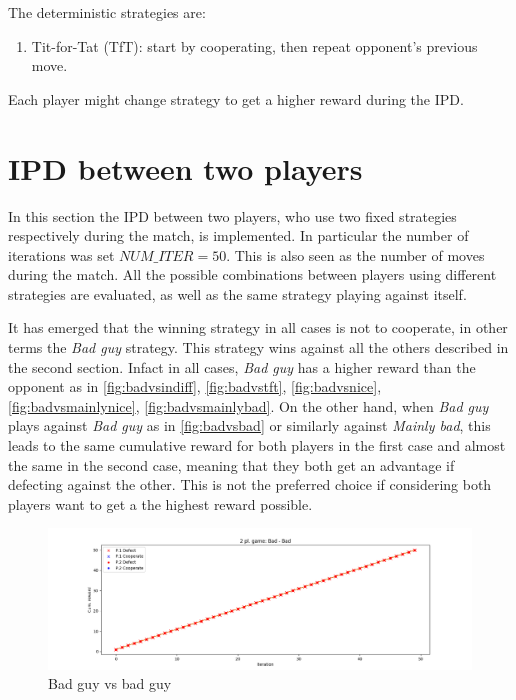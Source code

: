 \documentclass[journal,a4paper,10pt,twoside]{IEEEtran}
\begin{document}
The deterministic strategies are:
\begin{enumerate}
    \item Tit-for-Tat (TfT): start by cooperating, then repeat opponent's previous move.
\end{enumerate}

Each player might change strategy to get a higher reward during the IPD.

\section{IPD between two players}
In this section the IPD between two players, who use two fixed strategies respectively during the match, is implemented.
In particular the number of iterations was set $NUM\_ITER = 50$. This is also seen as the number of moves during the match. All the possible combinations between players using different strategies are evaluated, as well as the same strategy playing against itself.

It has emerged that the winning strategy in all cases is not to cooperate, in other terms the \textit{Bad guy} strategy. This strategy wins against all the others described in the second section. Infact in all cases, \textit{Bad guy} has a higher reward than the opponent as in \autoref{fig:badvsindiff}, \autoref{fig:badvstft}, \autoref{fig:badvsnice}, \autoref{fig:badvsmainlynice}, \autoref{fig:badvsmainlybad}. 
On the other hand, when \textit{Bad guy} plays against \textit{Bad guy} as in \autoref{fig:badvsbad} or similarly against \textit{Mainly bad}, this leads to the same cumulative reward for both players in the first case and almost the same in the second case, meaning that they both get an advantage if defecting against the other. This is not the preferred choice if considering both players want to get a the highest reward possible.

\begin{figure}
    \centering
    \includegraphics[width=1\columnwidth]{img_v1/idp2p-rewards-Bad-Bad.png}
    \caption{Bad guy vs bad guy}
    \label{fig:badvsbad}
\end{figure}
\end{document}
